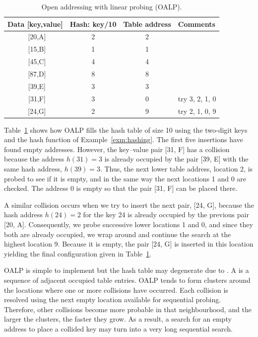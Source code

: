 \begin{table}[hbt]
\begin{center}
\caption{Open addressing with linear probing (OALP).}\label{hash-lin} 
\begin{tabular}{|c|c|c|l|} \hline 
\textbf{Data} [key,value] & \textbf{Hash}: key/10 & \textbf{Table address} & \textbf{Comments} \\ \hline
~[20,A] & 2 & 2 & \\
~[15,B] & 1 & 1 & \\
~[45,C] & 4 & 4 & \\
~[87,D] & 8 & 8 & \\
~[39,E] & 3 & 3 & \\
~[31,F] & 3 & 0 & try 3, 2, 1, 0 \\
~[24,G] & 2 & 9 & try 2, 1, 0, 9 \\ \hline
\end{tabular}
\end{center}
\end{table}

\begin{Example}\label{exm:lin:probing}
Table~\ref{hash-lin} shows how OALP fills the hash table 
of size 10 using the two-digit keys and the hash function
of Example~\ref{exm:hashing}. The first five insertions have found
empty addresses. However, the key--value 
pair [31, F] has a collision because the address 
\(h(31) = 3\) is already occupied by the pair [39, E] with the same
hash address, \(h(39) = 3\). Thus, the 
next lower table address, location 2, is probed to see if
it is empty, and in the same way the next locations 1
and 0 are checked. The address 0 is empty so that the pair [31, F]
can be placed there. 

A similar collision occurs when we try to insert the next
pair, [24, G], because the hash address \(h(24)=2\) for
the key 24 is already occupied by the previous pair [20, A]. 
Consequently,  we probe successive lower locations 1 and 0, and 
since they both are already
occupied, we wrap around and continue the search at the highest
location 9. Because it is empty, the pair [24, G] is inserted in this location 
yielding the final configuration given in Table~\ref{hash-lin}.
\end{Example}

OALP is simple to implement but the hash table may degenerate due to
. A  is a
sequence of adjacent occupied table entries. OALP tends to form clusters 
around the locations
where one or more collisions have occurred. Each
collision is resolved using the next empty location 
available for sequential probing. Therefore, other collisions 
become more probable in that neighbourhood, and the larger the
clusters, the faster they grow. As a result,
a search for an empty address to place a collided key may
turn into a very long sequential search. 

